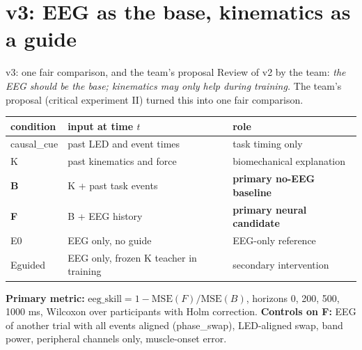 \documentclass[aspectratio=169,10pt]{beamer}
\begin{document}
\section{v3: EEG as the base, kinematics as a guide}

\begin{frame}{v3: one fair comparison, and the team's proposal}
  \small
  Review of v2 by the team: \emph{the EEG should be the base; kinematics may only help during training.}
  The team's proposal (critical experiment II) turned this into one fair comparison.

  \medskip
  \centering\scriptsize
  \begin{tabular}{lll}
    \toprule
    condition & input at time $t$ & role \\
    \midrule
    causal\_cue & past LED and event times & task timing only \\
    K & past kinematics and force & biomechanical explanation \\
    \textbf{B} & K + past task events & \textbf{primary no-EEG baseline} \\
    \textbf{F} & B + EEG history & \textbf{primary neural candidate} \\
    E0 & EEG only, no guide & EEG-only reference \\
    Eguided & EEG only, frozen K teacher in training & secondary intervention \\
    \bottomrule
  \end{tabular}

  \medskip
  \raggedright
  \textbf{Primary metric:} $\text{eeg\_skill}=1-\mathrm{MSE}(F)/\mathrm{MSE}(B)$, horizons 0, 200, 500, 1000 ms, Wilcoxon over
  participants with Holm correction. \textbf{Controls on F:} EEG of another trial with all events aligned
  (phase\_swap), LED-aligned swap, band power, peripheral channels only, muscle-onset error.
\end{frame}
\end{document}
